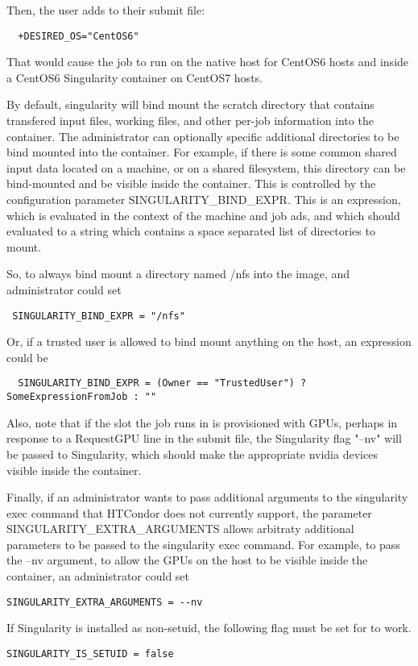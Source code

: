 Then, the user adds to their submit file:

\begin{verbatim}
  +DESIRED_OS="CentOS6"
\end{verbatim}

That would cause the job to run on the native host for CentOS6 hosts
and inside a CentOS6 Singularity container on CentOS7 hosts.

By default, singularity will bind mount the scratch directory that contains transfered input files, 
working files, and other per-job information into the container.  The administrator can optionally
specific additional directories to be bind mounted into the container.  For example, if there is some common
shared input data located on a machine, or on a shared filesystem, this directory can be bind-mounted 
and be visible inside the container.  This is controlled by the configuration parameter
SINGULARITY\_BIND\_EXPR.  This is an expression, which is evaluated in the context of the machine and job ads,
and which should evaluated to a string which contains a space separated list of directories to mount.

So, to always bind mount a directory named /nfs into the image, and administrator could set
\begin{verbatim}
 SINGULARITY_BIND_EXPR = "/nfs"
\end{verbatim}

Or, if a trusted user is allowed to bind mount anything on the host, an expression could be
\begin{verbatim}
  SINGULARITY_BIND_EXPR = (Owner == "TrustedUser") ? SomeExpressionFromJob : ""
\end{verbatim}

Also, note that if the slot the job runs in is provisioned with GPUs, perhaps
in response to a RequestGPU line in the submit file, the Singularity flag
"--nv" will be passed to Singularity, which should make the appropriate
nvidia devices visible inside the container.

Finally, if an administrator wants to pass additional arguments to the singularity exec command that HTCondor
does not currently support, the parameter SINGULARITY\_EXTRA\_ARGUMENTS allows arbitraty additional parameters
to be passed to the singularity exec command.  For example, to pass the --nv argument, to allow the GPUs on the
host to be visible inside the container, an administrator could set

\begin{verbatim}
SINGULARITY_EXTRA_ARGUMENTS = --nv
\end{verbatim}

If Singularity is installed as non-setuid, the following flag must be set
for  to work.

\begin{verbatim}
SINGULARITY_IS_SETUID = false
\end{verbatim}
